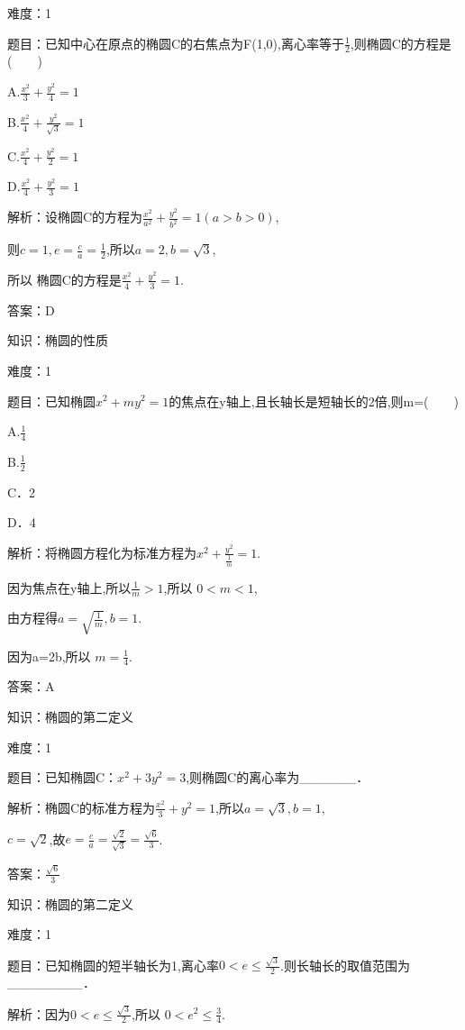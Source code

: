 \documentclass{article} %
\begin{document}
难度：1

题目：已知中心在原点的椭圆C的右焦点为F(1,0),离心率等于$\frac{1}{2}$,则椭圆C的方程是(　　)

A.$\frac{x^2}{3}+\frac{y^2}{4}=1$   

B.$\frac{x^2}{4}+\frac{y^2}{\sqrt{3}}=1$  

C.$\frac{x^2}{4}+\frac{y^2}{2}=1$    

D.$\frac{x^2}{4}+\frac{y^2}{3}=1$  

解析：设椭圆C的方程为$\frac{x^2}{a^2}+\frac{y^2}{b^2}=1(a>b>0)$,

则$c=1,e=\frac{c}{a}=\frac{1}{2}$,所以$a=2,b=\sqrt{3}$,

所以 椭圆C的方程是$\frac{x^2}{4}+\frac{y^2}{3}=1$.

答案：D



知识：椭圆的性质

难度：1

题目：已知椭圆$x^{2}+my^{2}=1$的焦点在y轴上,且长轴长是短轴长的2倍,则m=(　　)

A.$\frac{1}{4}$

B.$\frac{1}{2}$

C．2  

D．4

解析：将椭圆方程化为标准方程为$x^{2}+\frac{y^2}{\frac{1}{m}}=1$.

因为焦点在y轴上,所以$ \frac{1}{m}>1$,所以 $0<m<1$,

由方程得$a=\sqrt{\frac{1}{m}},b=1$.

因为a=2b,所以 $m=\frac{1}{4}$.

答案：A



知识：椭圆的第二定义

难度：1

题目：已知椭圆C：$x^{2}+3y^{2}=3$,则椭圆C的离心率为\_\_\_\_\_\_．

解析：椭圆C的标准方程为$\frac{x^2}{3}+y^{2}=1$,所以$a=\sqrt{3},b=1$,

$c=\sqrt{2}$,故$e=\frac{c}{a}=\frac{\sqrt{2}}{\sqrt{3}}=\frac{\sqrt{6}}{3}$.

答案：$\frac{\sqrt{6}}{3}$

知识：椭圆的第二定义

难度：1

题目：已知椭圆的短半轴长为1,离心率$0<e\le \frac{\sqrt{3}}{2}$.则长轴长的取值范围为\_\_\_\_\_\_\_\_．

解析：因为$0<e\le \frac{\sqrt{3}}{2}$,所以 $0<e^2\le \frac{3}{4}$.
\end{document}
